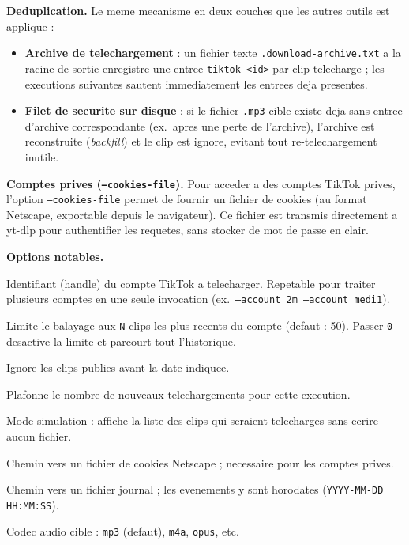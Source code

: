 \documentclass[11pt, a4paper]{article}
\begin{document}
\textbf{Deduplication.} Le meme mecanisme en deux couches que les autres outils
est applique :
\begin{itemize}
  \item \textbf{Archive de telechargement} : un fichier texte
    \texttt{.download-archive.txt} a la racine de sortie enregistre une entree
    \texttt{tiktok <id>} par clip telecharge ; les executions suivantes sautent
    immediatement les entrees deja presentes.
  \item \textbf{Filet de securite sur disque} : si le fichier \texttt{.mp3} cible
    existe deja sans entree d'archive correspondante (ex.~apres une perte de
    l'archive), l'archive est reconstruite (\emph{backfill}) et le clip est
    ignore, evitant tout re-telechargement inutile.
\end{itemize}

\textbf{Comptes prives (\texttt{--cookies-file}).} Pour acceder a des comptes
TikTok prives, l'option \texttt{--cookies-file} permet de fournir un fichier de
cookies (au format Netscape, exportable depuis le navigateur). Ce fichier est
transmis directement a yt-dlp pour authentifier les requetes, sans stocker de
mot de passe en clair.

\textbf{Options notables.}
\begin{description}[style=nextline, leftmargin=2.2em, labelindent=0.4em]
  \item[\texttt{--account}]
    Identifiant (handle) du compte TikTok a telecharger. Repetable pour traiter
    plusieurs comptes en une seule invocation
    (ex.~\texttt{--account 2m --account medi1}).
  \item[\texttt{--scan-limit N}]
    Limite le balayage aux \texttt{N} clips les plus recents du compte (defaut :
    50). Passer \texttt{0} desactive la limite et parcourt tout l'historique.
  \item[\texttt{--since YYYYMMDD}]
    Ignore les clips publies avant la date indiquee.
  \item[\texttt{--max-downloads N}]
    Plafonne le nombre de nouveaux telechargements pour cette execution.
  \item[\texttt{--dry-run}]
    Mode simulation : affiche la liste des clips qui seraient telecharges sans
    ecrire aucun fichier.
  \item[\texttt{--cookies-file}]
    Chemin vers un fichier de cookies Netscape ; necessaire pour les comptes
    prives.
  \item[\texttt{--log}]
    Chemin vers un fichier journal ; les evenements y sont horodates
    (\texttt{YYYY-MM-DD HH:MM:SS}).
  \item[\texttt{--audio-format}]
    Codec audio cible : \texttt{mp3} (defaut), \texttt{m4a}, \texttt{opus}, etc.
\end{description}
\end{document}
